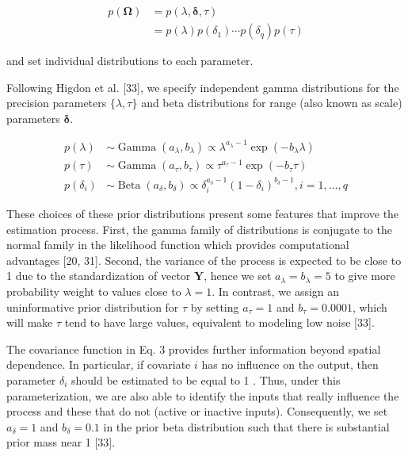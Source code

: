 \documentclass[10pt]{article}
\begin{document}
\begin{align*}
p(\boldsymbol{\Omega}) & =p(\lambda, \boldsymbol{\delta}, \tau) \\
& =p(\lambda) p\left(\delta_{1}\right) \cdots p\left(\delta_{q}\right) p(\tau) \tag{6}
\end{align*}


and set individual distributions to each parameter.

Following Higdon et al. [33], we specify independent gamma distributions for the precision parameters $\{\lambda, \tau\}$ and beta distributions for range (also known as scale) parameters $\boldsymbol{\delta}$.

$$
\begin{aligned}
p(\lambda) & \sim \operatorname{Gamma}\left(a_{\lambda}, b_{\lambda}\right) \propto \lambda^{a_{\lambda}-1} \exp \left(-b_{\lambda} \lambda\right) \\
p(\tau) & \sim \operatorname{Gamma}\left(a_{\tau}, b_{\tau}\right) \propto \tau^{a_{\tau}-1} \exp \left(-b_{\tau} \tau\right) \\
p\left(\delta_{i}\right) & \sim \operatorname{Beta}\left(a_{\delta}, b_{\delta}\right) \propto \delta_{i}^{a_{\delta}-1}\left(1-\delta_{i}\right)^{b_{\delta}-1}, i=1, \ldots, q
\end{aligned}
$$

These choices of these prior distributions present some features that improve the estimation process. First, the gamma family of distributions is conjugate to the normal family in the likelihood function which provides computational advantages [20, 31]. Second, the variance of the process is expected to be close to 1 due to the standardization of vector $\mathbf{Y}$, hence we set $a_{\lambda}=b_{\lambda}=5$ to give more probability weight to values close to $\lambda=1$. In contrast, we assign an uninformative prior distribution for $\tau$ by setting $a_{\tau}=1$ and $b_{\tau}=0.0001$, which will make $\tau$ tend to have large values, equivalent to modeling low noise [33].

The covariance function in Eq. 3 provides further information beyond spatial dependence. In particular, if covariate $i$ has no influence on the output, then parameter $\delta_{i}$ should be estimated to be equal to 1 . Thus, under this parameterization, we are also able to identify the inputs that really influence the process and these that do not (active or inactive inputs). Consequently, we set $a_{\delta}=1$ and $b_{\delta}=0.1$ in the prior beta distribution such that there is substantial prior mass near 1 [33].
\end{document}
